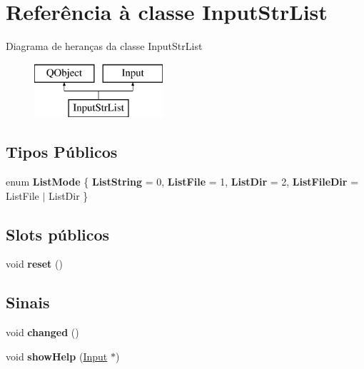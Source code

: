 \hypertarget{class_input_str_list}{\section{Referência à classe Input\-Str\-List}
\label{class_input_str_list}
}
Diagrama de heranças da classe Input\-Str\-List\begin{figure}[H]
\begin{center}
\leavevmode
\includegraphics[height=2.000000cm]{class_input_str_list}
\end{center}
\end{figure}
\subsection*{Tipos Públicos}
\begin{DoxyCompactItemize}
\item 
enum {\bfseries List\-Mode} \{ {\bfseries List\-String} = 0, 
{\bfseries List\-File} = 1, 
{\bfseries List\-Dir} = 2, 
{\bfseries List\-File\-Dir} = List\-File $|$ List\-Dir
 \}
\end{DoxyCompactItemize}
\subsection*{Slots públicos}
\begin{DoxyCompactItemize}
\item 
\hypertarget{class_input_str_list_ad20897c5c8bd47f5d4005989bead0e55}{void {\bfseries reset} ()}\label{class_input_str_list_ad20897c5c8bd47f5d4005989bead0e55}

\end{DoxyCompactItemize}
\subsection*{Sinais}
\begin{DoxyCompactItemize}
\item 
\hypertarget{class_input_str_list_a5d42414aede4a6105b6956c0aca81fa0}{void {\bfseries changed} ()}\label{class_input_str_list_a5d42414aede4a6105b6956c0aca81fa0}

\item 
\hypertarget{class_input_str_list_af32333a92f81f1f8570f1ddc0e5443d5}{void {\bfseries show\-Help} (\hyperlink{class_input}{Input} $\ast$)}\label{class_input_str_list_af32333a92f81f1f8570f1ddc0e5443d5}

\end{DoxyCompactItemize}
